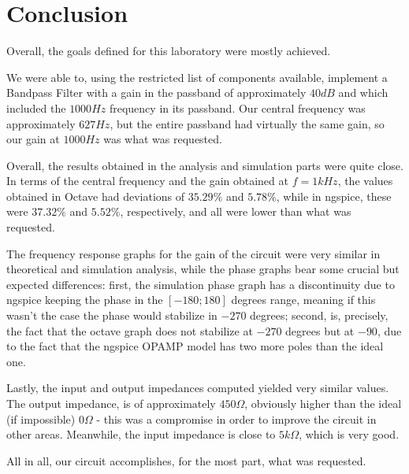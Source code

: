 \section{Conclusion}
\label{sec:conclusion}


Overall, the goals defined for this laboratory were mostly achieved.

We were able to, using the restricted list of components available, implement a Bandpass Filter with a gain in the passband of approximately $40 dB$ and which included the $1000 Hz$ frequency in its passband. Our central frequency was approximately $627 Hz$, but the entire passband had virtually the same gain, so our gain at $1000 Hz$ was what was requested.

Overall, the results obtained in the analysis and simulation parts were quite close. In terms of the central frequency and the gain obtained at $f = 1 kHz$, the values obtained in Octave had deviations of $35.29 \%$ and $5.78 \%$, while in ngspice, these were $37.32\%$ and $5.52 \%$, respectively, and all were lower than what was requested.

The frequency response graphs for the gain of the circuit were very similar in theoretical and simulation analysis, while the phase graphs bear some crucial but expected differences: first, the simulation phase graph has a discontinuity due to ngspice keeping the phase in the $[-180; 180]$ degrees range, meaning if this wasn't the case the phase would stabilize in $-270$ degrees; second, is, precisely, the fact that the octave graph does not stabilize at $-270$ degrees but at $-90$, due to the fact that the ngspice OPAMP model has two more poles than the ideal one.

Lastly, the input and output impedances computed yielded very similar values. The output impedance, is of approximately $450 \Omega$, obviously higher than the ideal (if impossible) $0 \Omega$ - this was a compromise in order to improve the circuit in other areas. Meanwhile, the input impedance is close to $5 k\Omega$, which is very good.

All in all, our circuit accomplishes, for the most part, what was requested.
